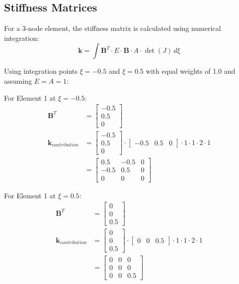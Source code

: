 \documentclass[12pt,a4paper]{article}
\begin{document}
\subsection{Stiffness Matrices}
For a 3-node element, the stiffness matrix is calculated using numerical integration:
\begin{equation}
\mathbf{k} = \int\mathbf{B}^T \cdot E \cdot \mathbf{B} \cdot A \cdot \det(J) \, d\xi
\end{equation}

Using integration points $\xi = -0.5$ and $\xi = 0.5$ with equal weights of 1.0 and assuming $E = A = 1$:

For Element 1 at $\xi = -0.5$:
\begin{align}
\mathbf{B}^T &= \begin{bmatrix} -0.5 \\ 0.5 \\ 0 \end{bmatrix} \\
\mathbf{k}_{contribution} &= \begin{bmatrix} -0.5 \\ 0.5 \\ 0 \end{bmatrix} \cdot \begin{bmatrix} -0.5 & 0.5 & 0 \end{bmatrix} \cdot 1 \cdot 1 \cdot 2 \cdot 1 \\
&= \begin{bmatrix} 0.5 & -0.5 & 0 \\ -0.5 & 0.5 & 0 \\ 0 & 0 & 0 \end{bmatrix}
\end{align}

For Element 1 at $\xi = 0.5$:
\begin{align}
\mathbf{B}^T &= \begin{bmatrix} 0 \\ 0 \\ 0.5 \end{bmatrix} \\
\mathbf{k}_{contribution} &= \begin{bmatrix} 0 \\ 0 \\ 0.5 \end{bmatrix} \cdot \begin{bmatrix} 0 & 0 & 0.5 \end{bmatrix} \cdot 1 \cdot 1 \cdot 2 \cdot 1 \\
&= \begin{bmatrix} 0 & 0 & 0 \\ 0 & 0 & 0 \\ 0 & 0 & 0.5 \end{bmatrix}
\end{align}
\end{document}
